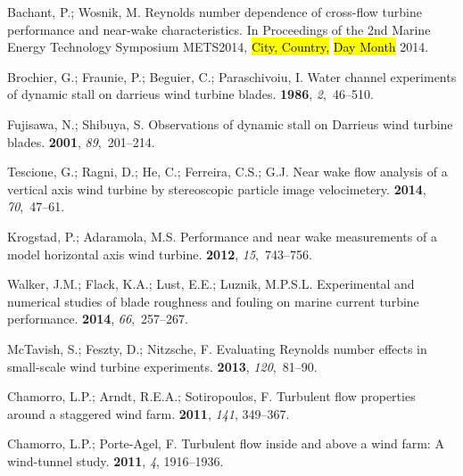 \documentclass[energies,article,accept,moreauthors,pdftex,10pt,a4paper]{mdpi}
\theoremstyle{mdpi}
\newcounter{ex}
\newcounter{re}
\begin{document}
\begin{thebibliography}{999}
Bachant, P.; Wosnik, M.
\newblock Reynolds number dependence of cross-flow turbine performance and
 near-wake characteristics.
\newblock In Proceedings of the 2nd Marine Energy Technology Symposium METS2014, \hl{City, Country,} \hl{Day Month} 2014.

Brochier, G.; Fraunie, P.; Beguier, C.; Paraschivoiu, I.
\newblock Water channel experiments of dynamic stall on darrieus wind turbine
 blades.
 {\bf 1986}, {\em
 2},~46--510.

Fujisawa, N.; Shibuya, S.
\newblock Observations of dynamic stall on Darrieus wind turbine blades.
 {\bf
 2001}, {\em 89},~201--214.

Tescione, G.; Ragni, D.; He, C.; Ferreira, C.S.; G.J.
\newblock Near wake flow analysis of a vertical axis wind turbine by
 stereoscopic particle image velocimetery.
 {\bf 2014}, {\em 70},~47--61.

Krogstad, P.; Adaramola, M.S.
\newblock Performance and near wake measurements of a model horizontal axis
 wind turbine.
 {\bf 2012}, {\em 15},~743--756.

Walker, J.M.; Flack, K.A.; Lust, E.E.; Luznik, M.P.S.L.
\newblock Experimental and numerical studies of blade roughness and fouling on
 marine current turbine performance.
 {\bf 2014}, {\em 66},~257--267.

McTavish, S.; Feszty, D.; Nitzsche, F.
\newblock Evaluating {R}eynolds number effects in small-scale wind turbine
 experiments.
 {\bf 2013}, {\em 120},~81--90.

Chamorro, L.P.; Arndt, R.E.A.; Sotiropoulos, F.
\newblock Turbulent flow properties around a staggered wind farm.
 {\bf 2011}, \emph{141}, 349--367.

Chamorro, L.P.; Porte-Agel, F.
\newblock Turbulent flow inside and above a wind farm: A wind-tunnel study.
 {\bf 2011}, {\em 4}, 1916--1936.


\end{thebibliography}
\end{document}
